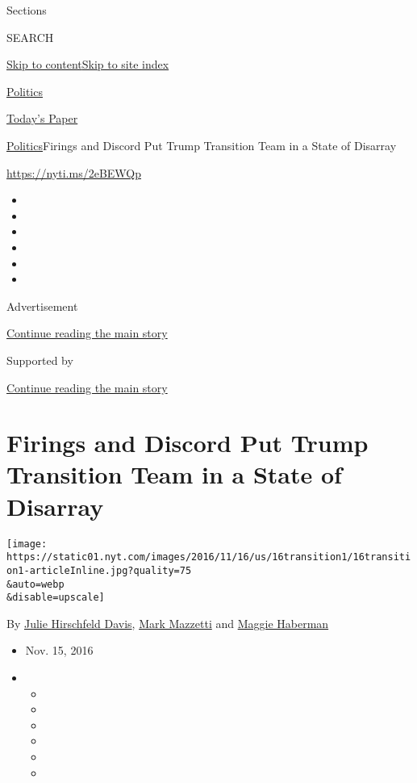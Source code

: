 Sections

SEARCH

\protect\hyperlink{site-content}{Skip to
content}\protect\hyperlink{site-index}{Skip to site index}

\href{https://www.nytimes.com/section/politics}{Politics}

\href{https://myaccount.nytimes.com/auth/login?response_type=cookie\&client_id=vi}{}

\href{https://www.nytimes.com/section/todayspaper}{Today's Paper}

\href{/section/politics}{Politics}\textbar{}Firings and Discord Put
Trump Transition Team in a State of Disarray

\url{https://nyti.ms/2eBEWQp}

\begin{itemize}
\item
\item
\item
\item
\item
\item
\end{itemize}

Advertisement

\protect\hyperlink{after-top}{Continue reading the main story}

Supported by

\protect\hyperlink{after-sponsor}{Continue reading the main story}

\hypertarget{firings-and-discord-put-trump-transition-team-in-a-state-of-disarray}{%
\section{Firings and Discord Put Trump Transition Team in a State of
Disarray}\label{firings-and-discord-put-trump-transition-team-in-a-state-of-disarray}}

\texttt{[image: https://static01.nyt.com/images/2016/11/16/us/16transition1/16transition1-articleInline.jpg?quality=75\\\&auto=webp\\\&disable=upscale]}

By \href{https://www.nytimes.com/by/julie-hirschfeld-davis}{Julie
Hirschfeld Davis}, \href{http://www.nytimes.com/by/mark-mazzetti}{Mark
Mazzetti} and \href{http://www.nytimes.com/by/maggie-haberman}{Maggie
Haberman}

\begin{itemize}
\item
  Nov. 15, 2016
\item
  \begin{itemize}
  \item
  \item
  \item
  \item
  \item
  \item
  \end{itemize}
\end{itemize}

